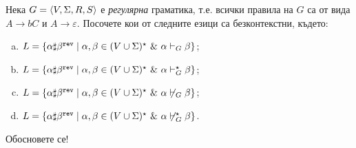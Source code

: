 
\begin{problem}
  Нека $G = \langle{V,\Sigma,R,S}\rangle$ е {\em регулярна} граматика, т.е.
  всички правила на $G$ са от вида $A \to bC$ и $A \to \varepsilon$.
  Посочете кои от следните езици са безконтекстни, където:
  \begin{enumerate}[a)]
  \item 
    $L = \{\alpha\sharp\beta^{\texttt{rev}} \mid \alpha,\beta \in (V \cup \Sigma)^\star\ \&\ \alpha \vdash_G \beta\}$;
  \item 
    $L = \{\alpha\sharp\beta^{\texttt{rev}} \mid \alpha,\beta \in (V \cup \Sigma)^\star\ \&\ \alpha \vdash^\star_G \beta\}$;
  \item
    $L = \{\alpha\sharp\beta^{\texttt{rev}} \mid \alpha,\beta \in (V \cup \Sigma)^\star\ \&\ \alpha \not\vdash_G \beta\}$;
  \item
    $L = \{\alpha\sharp\beta^{\texttt{rev}} \mid \alpha,\beta \in (V \cup \Sigma)^\star\ \&\ \alpha \not\vdash^\star_G \beta\}$.
  \end{enumerate}
  Обосновете се!
\end{problem}

